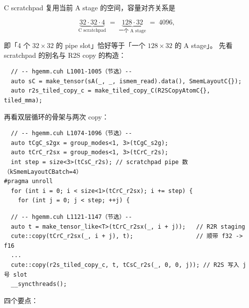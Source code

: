 C scratchpad 复用当前 A stage 的空间，容量对齐关系是

\begin{equation}
  \underbrace{32\cdot32\cdot4}_{\text{C scratchpad}}
  \;=\;
  \underbrace{128\cdot32}_{\text{一个 A stage}}
  \;=\; 4096 ,
  \label{eq:24-cpipe}
\end{equation}

即「4 个 $32\times32$ 的 pipe slot」恰好等于「一个 $128\times32$ 的 A stage」。
先看 scratchpad 的别名与 R2S copy 的构造：

\begin{lstlisting}
  // -- hgemm.cuh L1001-1005（节选）--
  auto sC = make_tensor(sA(_, _, ismem_read).data(), SmemLayoutC{});
  auto r2s_tiled_copy_c = make_tiled_copy_C(R2SCopyAtomC{}, tiled_mma);
\end{lstlisting}

再看双层循环的骨架与两次 copy：

\begin{lstlisting}
  // -- hgemm.cuh L1074-1096（节选）--
  auto tCgC_s2gx = group_modes<1, 3>(tCgC_s2g);
  auto tCrC_r2sx = group_modes<1, 3>(tCrC_r2s);
  int step = size<3>(tCsC_r2s); // scratchpad pipe 数（kSmemLayoutCBatch=4）
#pragma unroll
  for (int i = 0; i < size<1>(tCrC_r2sx); i += step) {
    for (int j = 0; j < step; ++j) {
\end{lstlisting}

\begin{lstlisting}
  // -- hgemm.cuh L1121-1147（节选）--
  auto t = make_tensor_like<T>(tCrC_r2sx(_, i + j));   // R2R staging
  cute::copy(tCrC_r2sx(_, i + j), t);                  // 顺带 f32 -> f16
  ...
  cute::copy(r2s_tiled_copy_c, t, tCsC_r2s(_, 0, 0, j)); // R2S 写入 j 号 slot
  __syncthreads();
\end{lstlisting}

四个要点：

